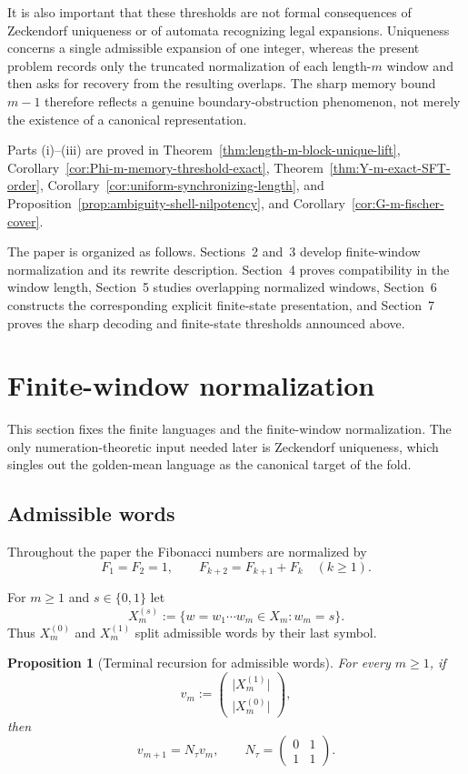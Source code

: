 \documentclass[11pt,letterpaper]{article}
\numberwithin{equation}{section}
\theoremstyle{plain}
\newtheorem{proposition}[theorem]{Proposition}
\theoremstyle{definition}
\theoremstyle{remark}
\begin{document}
It is also important that these thresholds are not formal consequences of
Zeckendorf uniqueness or of automata recognizing legal expansions.  Uniqueness
concerns a single admissible expansion of one integer, whereas the present
problem records only the truncated normalization of each length-$m$ window and
then asks for recovery from the resulting overlaps.  The sharp memory bound
$m-1$ therefore reflects a genuine boundary-obstruction phenomenon, not merely
the existence of a canonical representation.

Parts \textup{(i)}--\textup{(iii)} are proved in
Theorem~\ref{thm:length-m-block-unique-lift},
Corollary~\ref{cor:Phi-m-memory-threshold-exact},
Theorem~\ref{thm:Y-m-exact-SFT-order},
Corollary~\ref{cor:uniform-synchronizing-length}, and
Proposition~\ref{prop:ambiguity-shell-nilpotency}, and
Corollary~\ref{cor:G-m-fischer-cover}.

The paper is organized as follows.  Sections~2 and~3 develop finite-window
normalization and its rewrite description.  Section~4 proves compatibility in
the window length, Section~5 studies overlapping normalized windows,
Section~6 constructs the corresponding explicit finite-state presentation, and
Section~7 proves the sharp decoding and finite-state thresholds announced
above.

\section{Finite-window normalization}

This section fixes the finite languages and the finite-window normalization.
The only numeration-theoretic input needed later is Zeckendorf uniqueness,
which singles out the golden-mean language as the canonical target of the fold.

\subsection{Admissible words}

Throughout the paper the Fibonacci numbers are normalized by
\[
F_1=F_2=1,
\qquad
F_{k+2}=F_{k+1}+F_k
\quad (k\ge 1).
\]

For $m\ge 1$ and $s\in\{0,1\}$ let
\[
X_m^{(s)}:=\{w=w_1\cdots w_m\in X_m:w_m=s\}.
\]
Thus $X_m^{(0)}$ and $X_m^{(1)}$ split admissible words by their last symbol.

\begin{proposition}[Terminal recursion for admissible words]
\label{prop:stable-syntax-terminal-recursion}
For every $m\ge 1$, if
\[
v_m:=
\begin{pmatrix}
\lvert X_m^{(1)}\rvert\\[2pt]
\lvert X_m^{(0)}\rvert
\end{pmatrix},
\]
then
\[
v_{m+1}=N_\tau v_m,
\qquad
N_\tau=
\begin{pmatrix}
0&1\\[2pt]
1&1
\end{pmatrix}.
\]
\end{proposition}
\end{document}
